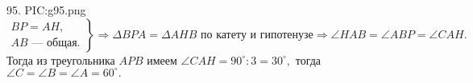 95. {{PIC:g95.png}}\\
$\left.\begin{array}{l}BP=AH,\\
AB\text{ --- общая.} \end{array}\right\}\Rightarrow \Delta BPA=\Delta AHB\text{ по катету и гипотенузе}\Rightarrow \angle HAB=\angle ABP=\angle CAH.$ Тогда из треугольника $APB$ имеем $\angle CAH=90^\circ:3=30^\circ,$ тогда $\angle C=\angle B=\angle A=60^\circ.$\\
